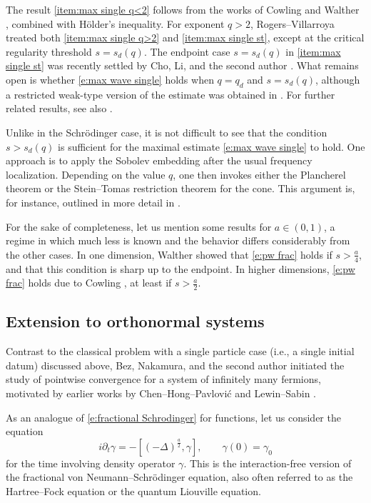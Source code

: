\documentclass[a4paper]{amsart}
\numberwithin{figure}{section}
\numberwithin{equation}{section}%
\theoremstyle{plain}%
\theoremstyle{definition}
\theoremstyle{remark}%
\begin{document}
The result \eqref{item:max single q<2} follows from the works of Cowling and Walther \cite{Cowling, Walther}, combined with H\"older's inequality. For exponent $q>2$, Rogers--Villarroya treated both \eqref{item:max single q>2} and \eqref{item:max single st}, except at  the critical regularity  threshold  $s=s_d(q)$. The endpoint case $s = s_d(q)$ in \eqref{item:max single st} was recently settled by Cho, Li, and the second author \cite{CLL25}. What remains open is whether \eqref{e:max wave single} holds when $q = q_d$ and $s = s_d(q)$, although a restricted weak-type version of the estimate was obtained in \cite{CLL25}. For further related results, see also \cite{BG14, M13}.







Unlike in the Schr\"odinger case, it is not difficult to see that the condition $s>s_d(q)$ is sufficient for the maximal estimate \eqref{e:max wave single} to hold. One approach is to apply the Sobolev embedding after the usual frequency localization.  Depending on the value $q$, one then invokes either the Plancherel theorem or the Stein--Tomas restriction theorem for the cone.  This argument is, for instance, outlined in more detail in \cite[Appendix A]{KKS}.


For the sake of completeness, let us mention some results for $a \in (0,1)$, a regime in which much less is known and the behavior differs considerably from the other cases. In one dimension, Walther \cite{Walther} showed that \eqref{e:pw frac} holds if $s > \frac{a}{4}$, and that this condition is sharp up to the endpoint. In higher dimensions, \eqref{e:pw frac} holds due to Cowling \cite{Cowling}, at least if $s > \frac{a}{2}$.





\subsection{Extension to orthonormal systems}

Contrast to the classical problem with a single particle case (i.e., a single initial datum)  discussed above, Bez, Nakamura, and the second author \cite{BLN_Selecta} initiated the study of pointwise convergence for a system of infinitely many fermions, motivated by earlier works by Chen--Hong--Pavlovi\'c \cite{CHP17, CHP18} and Lewin--Sabin \cite{LS15, LS14}.

As an analogue of \eqref{e:fractional Schrodinger} for functions, let us consider the equation 
\begin{equation}\label{e:fractional vNS}
i\partial_t\gamma
=
-[(-\Delta)^\frac a2,\gamma],
\qquad 
\gamma(0)=\gamma_0
\end{equation}
for the time involving density operator $\gamma$.
This is the interaction-free version of the fractional von Neumann--Schr\"odinger equation, also often referred to as the Hartree--Fock equation or the quantum Liouville equation.
\end{document}
